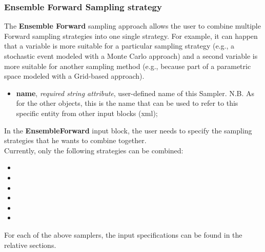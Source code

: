 \subsubsection{Ensemble Forward Sampling strategy}
\label{subsubsubsec:EnsembleSampler}
The \textbf{Ensemble Forward} sampling approach allows the user to combine multiple Forward sampling strategies
into one single strategy. For example, it can happen that a variable is more suitable for a particular sampling strategy (e.g., a
stochastic event
modeled with a Monte Carlo approach) and a second variable is more suitable for another sampling method (e.g., because part of a parametric space modeled with a Grid-based approach).
%
\attrsIntro
\vspace{-5mm}
\begin{itemize}
\itemsep0em
\item \textbf{name}, \textit{required string attribute}, user-defined name of this Sampler. N.B. As for the other objects, this is the name that can be used to refer to this specific entity from other input blocks (xml);
\end{itemize}
\vspace{-5mm}

In the \textbf{EnsembleForward} input block, the user needs to specify the sampling strategies that he wants to combine together.
\\Currently, only the following strategies can be combined:
\begin{itemize}
  \item {}
  \item {}
  \item {}
  \item {}
  \item {}
  \item {}
\end{itemize}
For each of the above samplers, the input specifications can be found in the relative sections.

